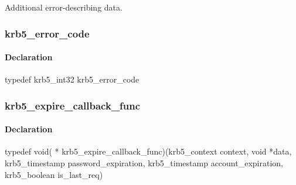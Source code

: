\documentclass[letterpaper,10pt,english]{sphinxmanual}
\begin{document}

\begin{fulllineitems}
\label{appdev/refs/types/krb5_error:krb5_error.e_data}
Additional error-describing data.

\end{fulllineitems}



\subsubsection{krb5\_error\_code}
\label{appdev/refs/types/krb5_error_code:krb5-error-code}\label{appdev/refs/types/krb5_error_code::doc}\label{appdev/refs/types/krb5_error_code:krb5-error-code-struct}

\begin{fulllineitems}
\label{appdev/refs/types/krb5_error_code:krb5_error_code}
\end{fulllineitems}



\paragraph{Declaration}
\label{appdev/refs/types/krb5_error_code:declaration}
typedef krb5\_int32 krb5\_error\_code


\subsubsection{krb5\_expire\_callback\_func}
\label{appdev/refs/types/krb5_expire_callback_func:krb5-expire-callback-func}\label{appdev/refs/types/krb5_expire_callback_func::doc}\label{appdev/refs/types/krb5_expire_callback_func:krb5-expire-callback-func-struct}

\begin{fulllineitems}
\label{appdev/refs/types/krb5_expire_callback_func:krb5_expire_callback_func}
\end{fulllineitems}



\paragraph{Declaration}
\label{appdev/refs/types/krb5_expire_callback_func:declaration}
typedef void( * krb5\_expire\_callback\_func)(krb5\_context context, void *data, krb5\_timestamp password\_expiration, krb5\_timestamp account\_expiration, krb5\_boolean is\_last\_req)
\end{document}
